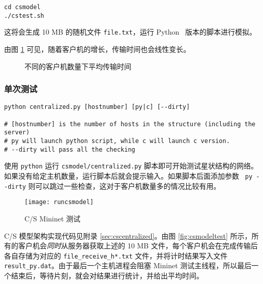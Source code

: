\begin{lstlisting}[style=commandshell]
cd csmodel
./cstest.sh
\end{lstlisting}

这将会生成 10 MB 的随机文件 \verb"file.txt"，运行 Python \faPython\ 版本的脚本进行模拟。

由图 \ref{fig:csmodelstat} 可见，随着客户机的增长，传输时间也会线性变长。

\begin{figure}[H]
    \centering
    \caption{不同的客户机数量下平均传输时间}\label{fig:csmodelstat}
\end{figure}    



\subsubsection{单次测试}

\begin{lstlisting}[style=commandshell]
python centralized.py [hostnumber] [py|c] [--dirty]

# [hostnumber] is the number of hosts in the structure (including the server)
# py will launch python script, while c will launch c version.
# --dirty will pass all the checking
\end{lstlisting}

使用 \verb"python" 运行 \verb"csmodel/centralized.py" 脚本即可开始测试星状结构的网络。如果没有给定主机数量，运行脚本后就会提示输入。如果脚本后面添加参数 \verb" py --dirty" 则可以跳过一些检查，这对于客户机数量多的情况比较有用。

\begin{figure}[H]
    \centering
    \texttt{[image: runcsmodel]}
    \caption{C/S Mininet 测试}\label{fig:csmodelrun}
\end{figure}

C/S 模型架构实现代码见附录 \ref{sec:cscentralized}。由图 \ref{fig:csmodeltest} 所示，所有的客户机会\emph{同时}从服务器获取上述的 10 MB 文件，每个客户机会在完成传输后各自存储为对应的 \verb"file_receive_h*.txt" 文件，并将计时结果写入文件 \verb"result_py.dat"。由于最后一个主机进程会阻塞 Mininet 测试主线程，所以最后一个结束后，等待片刻，就会对结果进行统计，并给出平均时间。

